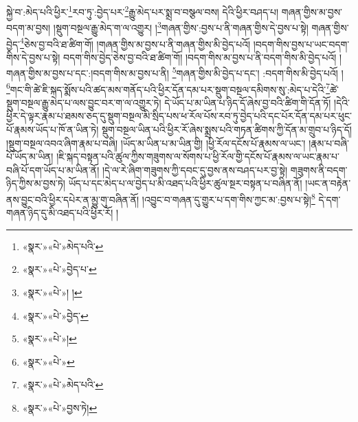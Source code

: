 སྐྱེ་བ་:མེད་པའི་ཕྱིར་\footnote{«སྣར་»«པེ་»མེད་པའི་}རབ་ཏུ་:བྱེད་པར་\footnote{«སྣར་»«པེ་»བྱེད་པ་}རྒྱུ་མེད་པར་སྨྲ་བ་བསྩལ་བས། དེའི་ཕྱིར་བཤད་པ། གཞན་གྱིས་མ་བྱས་བདག་མ་བྱས། །སྡུག་བསྔལ་རྒྱུ་མེད་ག་ལ་འགྱུར། །\footnote{«སྣར་»«པེ་»། ། }གཞན་གྱིས་:བྱས་པ་ནི་གཞན་གྱིས་དེ་བྱས་པ་སྟེ། གཞན་གྱིས་བྱེད་\footnote{«སྣར་»«པེ་»བྱེད་}ཅེས་བྱ་བའི་ཐ་ཚིག་གོ། །གཞན་གྱིས་མ་བྱས་པ་ནི་གཞན་གྱིས་མི་བྱེད་པའོ། །བདག་གིས་བྱས་པ་ཡང་བདག་གིས་དེ་བྱས་པ་སྟེ། བདག་གིས་བྱེད་ཅེས་བྱ་བའི་ཐ་ཚིག་གོ། །བདག་གིས་མ་བྱས་པ་ནི་བདག་གིས་མི་བྱེད་པའོ། །གཞན་གྱིས་མ་བྱས་པ་དང་:།བདག་གིས་མ་བྱས་པ་ནི། \footnote{«སྣར་»«པེ་»། }གཞན་གྱིས་མི་བྱེད་པ་དང་། :བདག་གིས་མི་བྱེད་པའོ། །\footnote{«སྣར་»«པེ་»}གང་གི་ཚེ་ཇི་སྐད་སྨོས་པའི་ཚད་མས་གནོད་པའི་ཕྱིར་དོན་དམ་པར་སྡུག་བསྔལ་དམིགས་སུ་:མེད་པ་དེའི་\footnote{«སྣར་»«པེ་»མེད་པའི་}ཚེ་སྡུག་བསྔལ་རྒྱུ་མེད་པ་ལས་བྱུང་བར་ག་ལ་འགྱུར་ཏེ། དེ་ཡོད་པ་མ་ཡིན་པ་ཉིད་དོ་ཞེས་བྱ་བའི་ཚིག་གི་དོན་ཏོ། །དེའི་ཕྱིར་དེ་ལྟར་རྣམ་པ་ཐམས་ཅད་དུ་སྡུག་བསྔལ་མི་སྲིད་པས་ཕ་རོལ་པོས་རབ་ཏུ་བྱེད་པའི་དང་པོར་དོན་དམ་པར་ཕུང་པོ་རྣམས་ཡོད་པ་ཁོ་ན་ཡིན་ཏེ། སྡུག་བསྔལ་ཡིན་པའི་ཕྱིར་རོ་ཞེས་སྨྲས་པའི་གཏན་ཚིགས་ཀྱི་དོན་མ་གྲུབ་པ་ཉིད་དོ། །སྡུག་བསྔལ་འབའ་ཞིག་རྣམ་པ་བཞི། །ཡོད་མ་ཡིན་པ་མ་ཡིན་གྱི། །ཕྱི་རོལ་དངོས་པོ་རྣམས་ལ་ཡང་། །རྣམ་པ་བཞི་པོ་ཡོད་མ་ཡིན། །ཇི་སྐད་བསྟན་པའི་ཚུལ་ཀྱིས་གཟུགས་ལ་སོགས་པ་ཕྱི་རོལ་གྱི་དངོས་པོ་རྣམས་ལ་ཡང་རྣམ་པ་བཞི་པོ་དག་ཡོད་པ་མ་ཡིན་ནོ། །དེ་ལ་རེ་ཞིག་གཟུགས་ཀྱི་དབང་དུ་བྱས་ནས་བཤད་པར་བྱ་སྟེ། གཟུགས་ནི་བདག་ཉིད་ཀྱིས་མ་བྱས་ཏེ། ཡོད་པ་དང་མེད་པ་ལ་བྱེད་པ་མི་འཐད་པའི་ཕྱིར་ཚུལ་སྔར་བསྟན་པ་བཞིན་ནོ། །ཡང་ན་བརྟེན་ནས་བྱུང་བའི་ཕྱིར་དཔེར་ན་མྱུ་གུ་བཞིན་ནོ། །འབྱུང་བ་གཞན་དུ་གྱུར་པ་དག་གིས་ཀྱང་མ་:བྱས་པ་སྟེ།\footnote{«སྣར་»«པེ་»བྱས་ཏེ།} དེ་དག་གཞན་ཉིད་དུ་མི་འཐད་པའི་ཕྱིར་རོ། །
